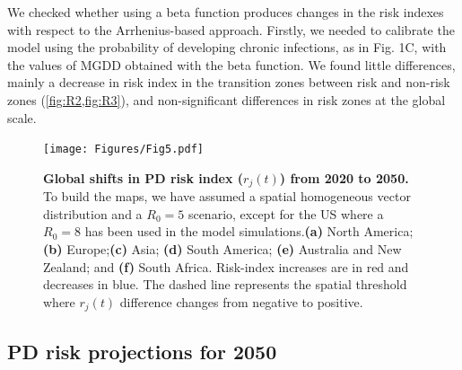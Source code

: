     We checked whether using a beta function produces changes in the risk
    indexes
    with respect to the Arrhenius-based approach. Firstly, we needed to
    calibrate
    the model using the probability of developing chronic infections, as in
    Fig.
    1C, with the values of MGDD obtained with the beta function. We found
    little
    differences, mainly a decrease in risk index in the transition zones
    between
    risk and non-risk zones (\cref{fig:R2,fig:R3}), and non-significant
    differences in risk zones at the global scale.

    \begin{figure}[H]
        \centering
        \texttt{[image: Figures/Fig5.pdf]}
        \caption[Global shifts in PD risk index ($r_j(t)$) from 2020 to
            2050]{\textbf{Global shifts in PD risk index ($r_j(t)$) from 2020
                to
                2050.} To build the maps, we have assumed a spatial homogeneous
            vector
            distribution and a $R_0=5$ scenario, except for the US where a
            $R_0=8$ has been
            used in the model simulations.\textbf{(a)} North
            America;\textbf{(b)}
            Europe;\textbf{(c)} Asia; \textbf{(d)} South America; \textbf{(e)}
            Australia
            and New Zealand; and \textbf{(f)} South Africa. Risk-index
            increases are in red
            and decreases in blue. The dashed line represents the spatial
            threshold where
            $r_j(t)$ difference changes from negative to positive.}
        \label{fig5}
    \end{figure}

    \subsection{PD risk projections for 2050}


